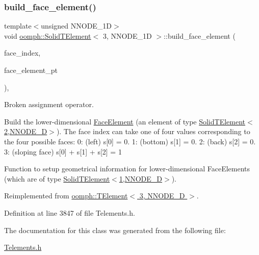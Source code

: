 \subsubsection{\texorpdfstring{build\+\_\+face\+\_\+element()}{build\_face\_element()}}
{\footnotesize\ttfamily template$<$unsigned N\+N\+O\+D\+E\+\_\+1D$>$ \\
void \hyperlink{classoomph_1_1SolidTElement}{oomph\+::\+Solid\+T\+Element}$<$ 3, N\+N\+O\+D\+E\+\_\+1D $>$\+::build\+\_\+face\+\_\+element (\begin{DoxyParamCaption}\item[{const int \&}]{face\+\_\+index,  }\item[{\hyperlink{classoomph_1_1FaceElement}{Face\+Element} $\ast$}]{face\+\_\+element\+\_\+pt }\end{DoxyParamCaption})\hspace{0.3cm}{\ttfamily [inline]}, {\ttfamily [virtual]}}



Broken assignment operator. 

Build the lower-\/dimensional \hyperlink{classoomph_1_1FaceElement}{Face\+Element} (an element of type \hyperlink{classoomph_1_1SolidTElement_3_012_00_01NNODE__1D_01_4}{Solid\+T\+Element$<$2,\+N\+N\+O\+D\+E\+\_\+D$>$}). The face index can take one of four values corresponding to the four possible faces\+: 0\+: (left) s\mbox{[}0\mbox{]} = 0. 1\+: (bottom) s\mbox{[}1\mbox{]} = 0. 2\+: (back) s\mbox{[}2\mbox{]} = 0. 3\+: (sloping face) s\mbox{[}0\mbox{]} + s\mbox{[}1\mbox{]} + s\mbox{[}2\mbox{]} = 1

Function to setup geometrical information for lower-\/dimensional Face\+Elements (which are of type \hyperlink{classoomph_1_1SolidTElement_3_011_00_01NNODE__1D_01_4}{Solid\+T\+Element$<$1,\+N\+N\+O\+D\+E\+\_\+D$>$}). 

Reimplemented from \hyperlink{classoomph_1_1TElement_3_013_00_01NNODE__1D_01_4_ad28be1d4ceed10d143dccbeb0021d507}{oomph\+::\+T\+Element$<$ 3, N\+N\+O\+D\+E\+\_\+D $>$}.



Definition at line 3847 of file Telements.\+h.



The documentation for this class was generated from the following file\+:\begin{DoxyCompactItemize}
\item 
\hyperlink{Telements_8h}{Telements.\+h}\end{DoxyCompactItemize}
